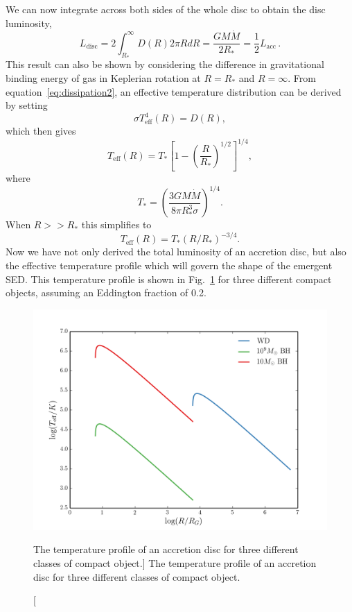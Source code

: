 We can now integrate across both sides of the whole disc to obtain the disc luminosity,
\begin{equation}
L_{\mathrm{disc}} = 2 \int^\infty_{R_*} D(R) 2\pi R dR = \frac{G M \dot{M}}{2 R_*} = \frac{1}{2} L_{\mathrm{acc}}\, .
\label{eq:ldisc}
\end{equation}
This result can also be shown by considering the difference in gravitational
binding energy of gas in Keplerian rotation at $R=R_*$ and $R=\infty$.
From equation~\ref{eq:dissipation2}, an 
effective temperature distribution can be derived by setting
\begin{equation}
\sigma T_{\mathrm{eff}}^4 (R) = D(R),
\end{equation}
which then gives
\begin{equation}
T_{\mathrm{eff}} (R) = T_* \left[1 - \left( \frac{R}{R_*} \right)^{1/2} \right]^{1/4},
\label{disk_t_profile}
\end{equation}
where
\begin{equation}
T_* = \left ( \frac{3 G M \dot{M}}{8 \pi R_*^3 \sigma} \right)^{1/4}.
\end{equation}
When $R>>R_*$ this simplifies to
\begin{equation}
T_{\mathrm{eff}} (R) = T_* (R / R_*)^{-3/4}.
\end{equation}
Now we have not only derived the total luminosity of an accretion disc, but
also the effective temperature profile which will govern the shape of the emergent SED.
This temperature profile is shown in Fig.~\ref{fig:disk_t}
for three different compact objects, assuming an Eddington fraction of 0.2.

\begin{figure}
\centering
\includegraphics[width=1.0\textwidth]{figures/01-intro/disk_t.png}
\caption
[The temperature profile of an accretion disc for three different classes
of compact object.]
{
The temperature profile of an accretion disc for three different classes
of compact object.
} 
\label{fig:disk_t}
\end{figure}

